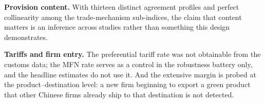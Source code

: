 \documentclass[11pt]{article}
\begin{document}
\textbf{Provision content.} With thirteen distinct agreement profiles and perfect collinearity among
the trade-mechanism sub-indices, the claim that content matters is an inference across studies rather
than something this design demonstrates.

\textbf{Tariffs and firm entry.} The preferential tariff rate was not obtainable from the customs
data; the MFN rate serves as a control in the robustness battery only, and the headline estimates do
not use it. And the extensive margin is probed at the product--destination level: a new firm
beginning to export a green product that other Chinese firms already ship to that destination is not
detected.
\end{document}
